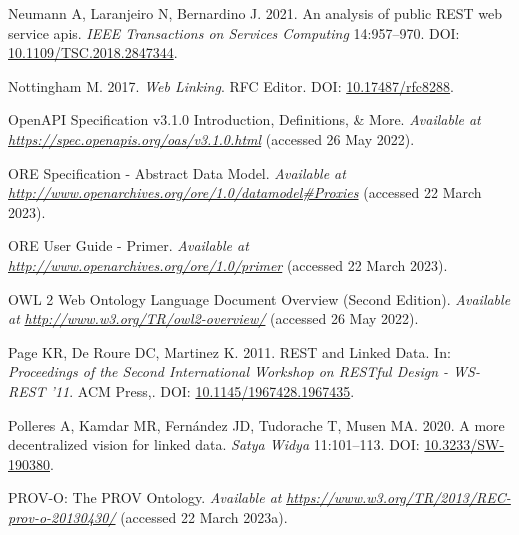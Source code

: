 \begin{CSLReferences}{1}{0}
\leavevmode{}%
Neumann A, Laranjeiro N, Bernardino J. 2021. An analysis of public REST web service apis. \emph{IEEE Transactions on Services Computing} 14:957--970. DOI: \href{https://doi.org/10.1109/TSC.2018.2847344}{10.1109/TSC.2018.2847344}.

\leavevmode{}%
Nottingham M. 2017. \emph{Web Linking}. RFC Editor. DOI: \href{https://doi.org/10.17487/rfc8288}{10.17487/rfc8288}.

\leavevmode{}%
OpenAPI Specification v3.1.0 \textbar{} Introduction, Definitions, \& More. \emph{Available at} \href{https://spec.openapis.org/oas/v3.1.0.html}{\emph{https://spec.openapis.org/oas/v3.1.0.html}} (accessed 26 May 2022).

\leavevmode{}%
ORE Specification - Abstract Data Model. \emph{Available at} \href{http://www.openarchives.org/ore/1.0/datamodel\#Proxies}{\emph{http://www.openarchives.org/ore/1.0/datamodel\#Proxies}} (accessed 22 March 2023).

\leavevmode{}%
ORE User Guide - Primer. \emph{Available at} \href{http://www.openarchives.org/ore/1.0/primer}{\emph{http://www.openarchives.org/ore/1.0/primer}} (accessed 22 March 2023).

\leavevmode{}%
OWL 2 Web Ontology Language Document Overview (Second Edition). \emph{Available at} \href{http://www.w3.org/TR/owl2-overview/}{\emph{http://www.w3.org/TR/owl2-overview/}} (accessed 26 May 2022).

\leavevmode{}%
Page KR, De Roure DC, Martinez K. 2011. REST and Linked Data. In: \emph{Proceedings of the Second International Workshop on RESTful Design - WS-REST '11}. ACM Press,. DOI: \href{https://doi.org/10.1145/1967428.1967435}{10.1145/1967428.1967435}.

\leavevmode{}%
Polleres A, Kamdar MR, Fernández JD, Tudorache T, Musen MA. 2020. A more decentralized vision for linked data. \emph{Satya Widya} 11:101--113. DOI: \href{https://doi.org/10.3233/SW-190380}{10.3233/SW-190380}.

\leavevmode{}%
PROV-O: The PROV Ontology. \emph{Available at} \href{https://www.w3.org/TR/2013/REC-prov-o-20130430/}{\emph{https://www.w3.org/TR/2013/REC-prov-o-20130430/}} (accessed 22 March 2023a).


\end{CSLReferences}
